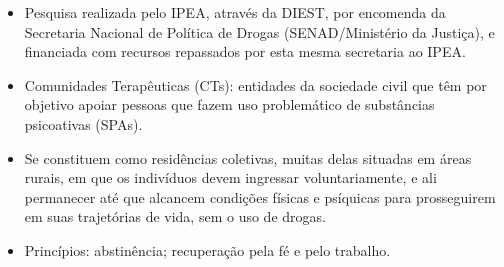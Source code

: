 
\begin{exampleblock}{}
\begin{itemize}[<+-| alert@+>]
	\item Pesquisa realizada pelo IPEA, através da DIEST, por encomenda da Secretaria Nacional de Política de Drogas (SENAD/Ministério da Justiça), e financiada com recursos repassados por esta mesma secretaria ao IPEA.
	\item Comunidades Terapêuticas (CTs): entidades da sociedade civil que têm por objetivo apoiar pessoas que fazem uso problemático de substâncias psicoativas (SPAs).
	\item Se constituem como residências coletivas, muitas delas situadas em áreas rurais, em que os indivíduos devem ingressar voluntariamente, e ali permanecer até que alcancem condições físicas e psíquicas para prosseguirem em suas trajetórias de vida, sem o uso de drogas.
	\item Princípios: abstinência; recuperação pela fé e pelo trabalho.
\end{itemize}
\end{exampleblock}